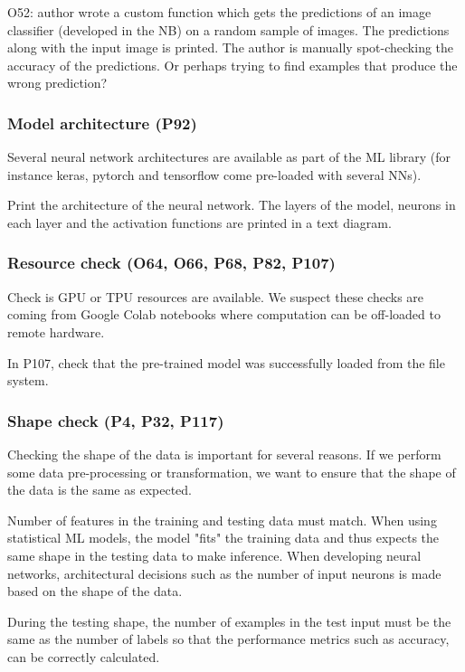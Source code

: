 O52: author wrote a custom function which gets the predictions of an image classifier (developed in the NB) on a random sample of images. The predictions along with the input image is printed. The author is manually spot-checking the accuracy of the predictions. Or perhaps trying to find examples that produce the wrong prediction?

\subsubsection{Model architecture (P92)}

Several neural network architectures are available as part of the ML library (for instance keras, pytorch and tensorflow come pre-loaded with several NNs).

Print the architecture of the neural network. The layers of the model, neurons in each layer and the activation functions are printed in a text diagram.

\subsubsection{Resource check (O64, O66, P68, P82, P107)}

Check is GPU or TPU resources are available. We suspect these checks are coming from Google Colab notebooks where computation can be off-loaded to remote hardware.

In P107, check that the pre-trained model was successfully loaded from the file system.

\subsubsection{Shape check (P4, P32, P117)}

Checking the shape of the data is important for several reasons. If we perform some data pre-processing or transformation, we want to ensure that the shape of the data is the same as expected.

Number of features in the training and testing data must match. When using statistical ML models, the model "fits" the training data and thus expects the same shape in the testing data to make inference. When developing neural networks, architectural decisions such as the number of input neurons is made based on the shape of the data.

During the testing shape, the number of examples in the test input must be the same as the number of labels so that the performance metrics such as accuracy, can be correctly calculated.

